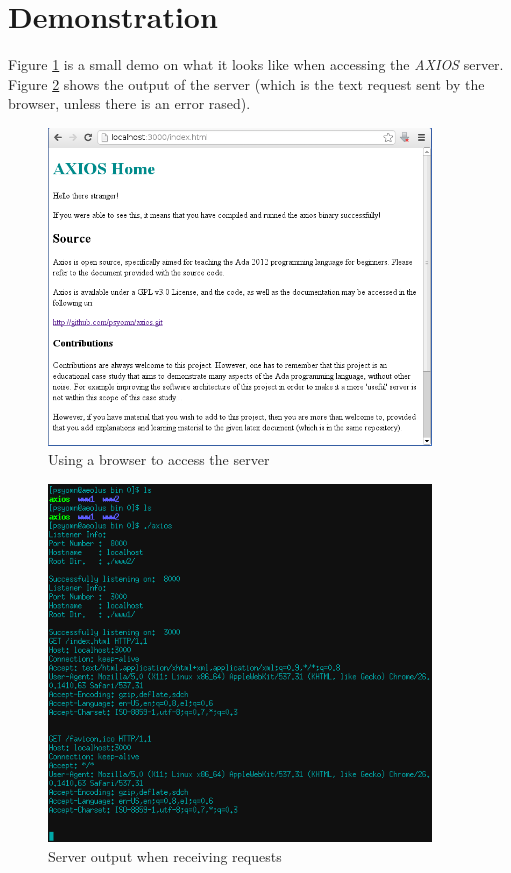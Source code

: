 \section{Demonstration}
Figure \ref{fig:browser-demo} is a small demo on what it looks like when accessing the \textit{AXIOS} server. Figure \ref{fig:server-output} shows the output of the server (which is the text request sent by the browser, unless there is an error rased).

\begin{figure}[hb]
\centering
\includegraphics[width=4in]{gfx/home-page.png}
\caption{Using a browser to access the server}
\label{fig:browser-demo}
\end{figure}

\begin{figure}[hb]
\centering
\includegraphics[width=4in]{gfx/server-echo.png}
\caption{Server output when receiving requests}
\label{fig:server-output}
\end{figure}


